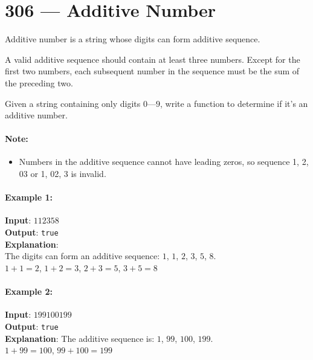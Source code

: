 \section{306 --- Additive Number}
Additive number is a string whose digits can form additive sequence.
\par
A valid additive sequence should contain at least three numbers. Except for the first two numbers, each subsequent number in the sequence must be the sum of the preceding two.
\par
Given a string containing only digits $0$---$9$, write a function to determine if it's an additive number.
\par
\paragraph{Note: }
\begin{itemize}
\item Numbers in the additive sequence cannot have leading zeros, so sequence 1, 2, 03 or 1, 02, 3 is invalid.
\end{itemize}

\paragraph{Example 1:}

\begin{flushleft}
\textbf{Input}: $112358$
\\
\textbf{Output}: \texttt{true} 
\\
\textbf{Explanation}: 
\\The digits can form an additive sequence: $1$, $1$, $ 2 $, $ 3 $, $ 5 $, $ 8 $.
\\ 
$ 1 + 1 = 2 $, $ 1 + 2 = 3 $, $ 2 + 3 = 5 $, $ 3 + 5 = 8 $
\end{flushleft}

\paragraph{Example 2:}

\begin{flushleft}
\textbf{Input}: $ 199100199 $
\\
\textbf{Output}: \texttt{true}
\\ 
\textbf{Explanation}: The additive sequence is: $ 1 $, $ 99 $, $ 100 $, $ 199 $.
\\ 
$ 1 + 99 = 100 $, $ 99 + 100 = 199 $
\end{flushleft}

